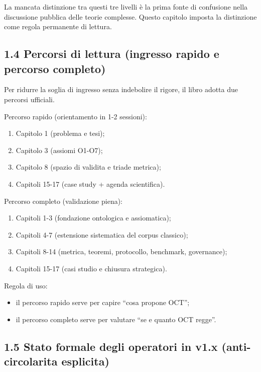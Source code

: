 La mancata distinzione tra questi tre livelli è la prima fonte di confusione nella discussione pubblica delle teorie complesse. Questo capitolo imposta la distinzione come regola permanente di lettura.

\subsection{1.4 Percorsi di lettura (ingresso rapido e percorso completo)}

Per ridurre la soglia di ingresso senza indebolire il rigore, il libro adotta due percorsi ufficiali.

Percorso rapido (orientamento in 1-2 sessioni):

\begin{enumerate}
\def\labelenumi{\arabic{enumi}.}
\tightlist
\item
  Capitolo 1 (problema e tesi);
\item
  Capitolo 3 (assiomi O1-O7);
\item
  Capitolo 8 (spazio di validita e triade metrica);
\item
  Capitoli 15-17 (case study + agenda scientifica).
\end{enumerate}

Percorso completo (validazione piena):

\begin{enumerate}
\def\labelenumi{\arabic{enumi}.}
\tightlist
\item
  Capitoli 1-3 (fondazione ontologica e assiomatica);
\item
  Capitoli 4-7 (estensione sistematica del corpus classico);
\item
  Capitoli 8-14 (metrica, teoremi, protocollo, benchmark, governance);
\item
  Capitoli 15-17 (casi studio e chiusura strategica).
\end{enumerate}

Regola di uso:

\begin{itemize}
\tightlist
\item
  il percorso rapido serve per capire ``cosa propone OCT'';
\item
  il percorso completo serve per valutare ``se e quanto OCT regge''.
\end{itemize}

\subsection{1.5 Stato formale degli operatori in v1.x (anti-circolarita esplicita)}

